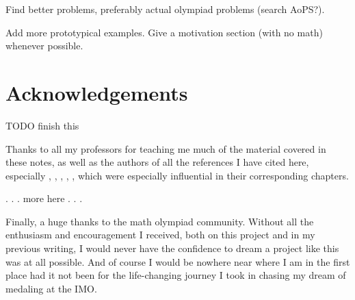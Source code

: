 Find better problems, preferably actual olympiad problems (search AoPS?).

Add more prototypical examples.
Give a motivation section (with no math) whenever possible.

\section*{Acknowledgements}
TODO finish this

Thanks to all my professors for teaching me much of the
material covered in these notes,
as well as the authors of all the references I have cited here,
especially
\cite{ref:55a},
\cite{ref:msci},
\cite{ref:dartmouth},
\cite{ref:oggier_NT},
\cite{ref:manifolds},
which were especially influential in their corresponding chapters.

. . . more here . . .

Finally, a huge thanks to the math olympiad community.
Without all the enthusiasm and encouragement I received,
both on this project and in my previous writing,
I would never have the confidence to dream a project like this
was at all possible.
And of course I would be nowhere near where I am in the first place
had it not been for the life-changing journey I took
in chasing my dream of medaling at the IMO.
